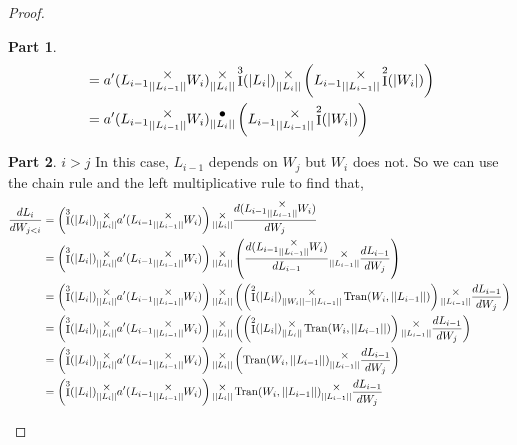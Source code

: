 \documentclass[12pt]{book}
\theoremstyle{plain}
\theoremstyle{definition}
\theoremstyle{ppart}
\newtheorem{ppart}{Part}
\theoremstyle{case}
\theoremstyle{solution}
\DeclareMathOperator{\Ident}{I}
\DeclareMathOperator{\Tran}{Tran}
\newcommand{\mmult}[1]{\text{\raisebox{1ex}{$\underset{#1}{\times}$}}}
\newcommand{\dmult}[1]{\text{\raisebox{1ex}{$\underset{#1}{\,\bullet\,}$}}}
\newcommand{\shape}[1]{\left|#1\right|}
\begin{document}
\begin{landscape}
\begin{proof}
\begin{ppart}
\begin{align*}
  &=
    a'(L_{i-1} \mmult{\shape{\shape{L_{i-1}}}} W_i) \mmult{\shape{\shape{L_i}}} \Ident^3(\shape{L_i})
    \mmult{\shape{\shape{L_i}}}
    \left(L_{i-1} \mmult{\shape{\shape{L_{i-1}}}} \Ident^2(\shape{W_i})\right) \\
  &=
    a'(L_{i-1} \mmult{\shape{\shape{L_{i-1}}}} W_i) \dmult{\shape{\shape{L_i}}}
    \left(L_{i-1} \mmult{\shape{\shape{L_{i-1}}}} \Ident^2(\shape{W_i})\right)
\end{align*}
\end{ppart}
\begin{ppart} $i > j$
In this case, $L_{i-1}$ depends on $W_j$ but $W_i$ does not. So we can use the chain rule and the
left multiplicative rule to find that,
\begin{align*}
  \frac{dL_i}{dW_{j<i}}
  &=
    \left(\Ident^3(\shape{L_i}) \mmult{\shape{\shape{L_i}}} a'(L_{i-1} \mmult{\shape{\shape{L_{i-1}}}} W_i) \right) 
    \mmult{\shape{\shape{L_i}}}
    \frac{d (L_{i-1} \mmult{\shape{\shape{L_{i-1}}}} W_i)}{dW_j} \\
  &=
    \left(\Ident^3(\shape{L_i}) \mmult{\shape{\shape{L_i}}} a'(L_{i-1} \mmult{\shape{\shape{L_{i-1}}}} W_i) \right) 
    \mmult{\shape{\shape{L_i}}}
    \left(
      \frac{d (L_{i-1} \mmult{\shape{\shape{L_{i-1}}}} W_i)}{dL_{i-1}}
      \mmult{\shape{\shape{L_{i-1}}}}
      \frac{dL_{i-1}}{dW_j}
    \right) \\
  &=
    \left(\Ident^3(\shape{L_i}) \mmult{\shape{\shape{L_i}}} a'(L_{i-1} \mmult{\shape{\shape{L_{i-1}}}} W_i) \right) 
    \mmult{\shape{\shape{L_i}}}
    \left(
      \left(
        \Ident^2(\shape{L_{i}})
        \mmult{\shape{\shape{W_i}}-\shape{\shape{L_{i-1}}}}
        \Tran(W_i, \shape{\shape{L_{i-1}}})
      \right)
      \mmult{\shape{\shape{L_{i-1}}}}
      \frac{d L_{i-1}}{dW_j}
    \right) \\
  &=
    \left(\Ident^3(\shape{L_i}) \mmult{\shape{\shape{L_i}}} a'(L_{i-1} \mmult{\shape{\shape{L_{i-1}}}} W_i) \right) 
    \mmult{\shape{\shape{L_i}}}
    \left(
      \left(
        \Ident^2(\shape{L_{i}})
        \mmult{\shape{\shape{L_i}}}
        \Tran(W_i, \shape{\shape{L_{i-1}}})
      \right)
      \mmult{\shape{\shape{L_{i-1}}}}
      \frac{d L_{i-1}}{dW_j}
    \right) \\
  &=
    \left(\Ident^3(\shape{L_i}) \mmult{\shape{\shape{L_i}}} a'(L_{i-1} \mmult{\shape{\shape{L_{i-1}}}} W_i) \right) 
    \mmult{\shape{\shape{L_i}}}
    \left(
      \Tran(W_i, \shape{\shape{L_{i-1}}})
      \mmult{\shape{\shape{L_{i-1}}}}
      \frac{d L_{i-1}}{dW_j}
    \right) \\
  &=
    \left(\Ident^3(\shape{L_i}) \mmult{\shape{\shape{L_i}}} a'(L_{i-1} \mmult{\shape{\shape{L_{i-1}}}} W_i) \right) 
    \mmult{\shape{\shape{L_i}}}
    \Tran(W_i, \shape{\shape{L_{i-1}}})
    \mmult{\shape{\shape{L_{i-1}}}}
    \frac{d L_{i-1}}{dW_j}
\end{align*}
\end{ppart}
\end{proof}
\end{landscape}
\end{document}
